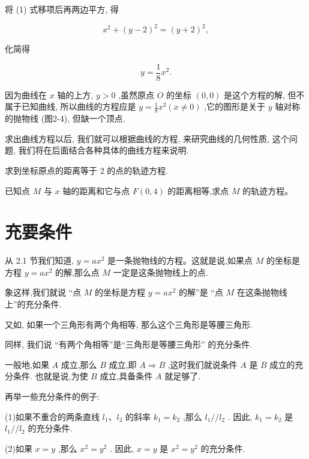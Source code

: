 \documentclass[lang=cn,newtx,10.5pt,scheme=chinese]{elegantbook}
\begin{document}
将 (1) 式移项后再两边平方, 得

\[
    {x}^{2} + {\left( y - 2\right) }^{2} = {\left( y + 2\right) }^{2},
\]

化简得

\[
  y = \frac{1}{8}{x}^{2}.
\]

因为曲线在 \(x\) 轴的上方, \(y > 0\) ,虽然原点 \(O\) 的坐标 \(\left( {0,0}\right)\) 是这个方程的解, 但不属于已知曲线, 所以曲线的方程应是 \(y = \frac{1}{8}{x}^{2}\left( {x \neq 0}\right)\) ,它的图形是关于 \(y\) 轴对称的抛物线 (图2-4), 但缺一个顶点.

求出曲线方程以后, 我们就可以根据曲线的方程, 来研究曲线的几何性质, 这个问题, 我们将在后面结合各种具体的曲线方程来说明.

\begin{problemset}[练习]

\item 求到坐标原点的距离等于 2 的点的轨迹方程.

\item 已知点 \(M\) 与 \(x\) 轴的距离和它与点 \(F\left( {0,4}\right)\) 的距离相等,求点 \(M\) 的轨迹方程。

\end{problemset}

\section{充要条件}

从 2.1 节我们知道, \(y = a{x}^{2}\) 是一条抛物线的方程。这就是说,如果点 \(M\) 的坐标是方程 \(y = a{x}^{2}\) 的解,那么点 \(M\) 一定是这条抛物线上的点.

象这样,我们就说 “点 \(M\) 的坐标是方程 \(y = a{x}^{2}\) 的解”是 “点 \(M\) 在这条抛物线上”的充分条件.

又如, 如果一个三角形有两个角相等, 那么这个三角形是等腰三角形.

同样, 我们说 “有两个角相等”是“三角形是等腰三角形” 的充分条件.
\begin{definition}[充分条件]
一般地,如果 \(A\) 成立,那么 \(B\) 成立,即 \(A \Rightarrow B\) ,这时我们就说条件 \(A\) 是 \(B\) 成立的充分条件. 也就是说,为使 \(B\) 成立,具备条件 \(A\) 就足够了.
\end{definition}
再举一些充分条件的例子:

(1)如果不重合的两条直线 \({l}_{1}\text{、}{l}_{2}\) 的斜率 \({k}_{1} = {k}_{2}\) ,那么 \({l}_{1}//{l}_{2}\) . 因此, \({k}_{1} = {k}_{2}\) 是 \({l}_{1}//{l}_{2}\) 的充分条件.

(2)如果 \(x = y\) ,那么 \({x}^{2} = {y}^{2}\) . 因此, \(x = y\) 是 \({x}^{2} = {y}^{2}\) 的充分条件.
\end{document}

